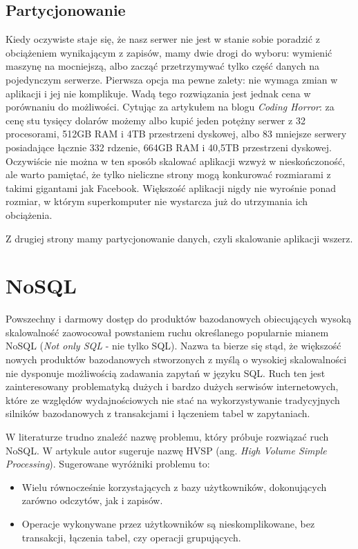 \subsection{Partycjonowanie}
Kiedy oczywiste staje się, że nasz serwer nie jest w stanie sobie poradzić z obciążeniem wynikającym z zapisów, mamy dwie drogi do wyboru: wymienić maszynę na mocniejszą, albo zacząć przetrzymywać tylko część danych na pojedynczym serwerze.
Pierwsza opcja ma pewne zalety: nie wymaga zmian w aplikacji i jej nie komplikuje.
Wadą tego rozwiązania jest jednak cena w porównaniu do możliwości.
Cytując za artykułem na blogu \emph{Coding Horror}\cite{codinghorror-scaling-up-vs-out}: za cenę stu tysięcy dolarów możemy albo kupić jeden potężny serwer z 32 procesorami, 512GB RAM i 4TB przestrzeni dyskowej, albo 83 mniejsze serwery posiadające łącznie 332 rdzenie, 664GB RAM i 40,5TB przestrzeni dyskowej.
Oczywiście nie można w ten sposób skalować aplikacji wzwyż w nieskończoność, ale warto pamiętać, że tylko nieliczne strony mogą konkurować rozmiarami z takimi gigantami jak Facebook.
Większość aplikacji nigdy nie wyrośnie ponad rozmiar, w którym superkomputer nie wystarcza już do utrzymania ich obciążenia.

Z drugiej strony mamy partycjonowanie danych, czyli skalowanie aplikacji wszerz. 

\section{NoSQL}
Powszechny i darmowy dostęp do produktów bazodanowych obiecujących wysoką skalowalność zaowocował powstaniem ruchu określanego popularnie mianem NoSQL (\emph{Not only SQL} - nie tylko SQL). 
Nazwa ta bierze się stąd, że większość nowych produktów bazodanowych stworzonych z myślą o wysokiej skalowalności nie dysponuje możliwością zadawania zapytań w języku SQL. 
Ruch ten jest zainteresowany problematyką dużych i bardzo dużych serwisów internetowych, które ze względów wydajnościowych nie stać na wykorzystywanie tradycyjnych silników bazodanowych z transakcjami i łączeniem tabel w zapytaniach.

W literaturze trudno znaleźć nazwę problemu, który próbuje rozwiązać ruch NoSQL. 
W artykule \cite{monash-db-hvsp} autor sugeruje nazwę HVSP (ang. \emph{High Volume Simple Processing}). 
Sugerowane wyróżniki problemu to:
\begin{itemize}
 \item Wielu równocześnie korzystających z bazy użytkowników, dokonujących zarówno odczytów, jak i zapisów.
 \item Operacje wykonywane przez użytkowników są nieskomplikowane, bez transakcji, łączenia tabel, czy operacji grupujących.
\end{itemize}

